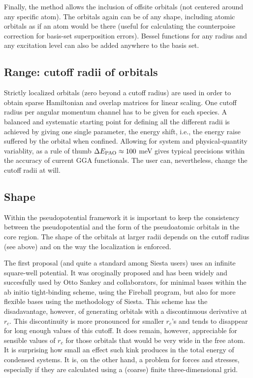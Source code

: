 \documentclass[11pt]{article}
\begin{document}
  Finally, the method allows the inclusion of offsite orbitals (not centered
around any specific atom). The orbitals again can be of any shape, including
atomic orbitals as if an atom would be there (useful for calculating the
counterpoise correction for basis-set superposition errors). 
Bessel functions for any radius and any excitation level can also be 
added anywhere to the basis set.

\subsection{Range: cutoff radii of orbitals}

  Strictly localized orbitals (zero beyond a cutoff radius) are used
in order to obtain sparse Hamiltonian and overlap matrices for linear 
scaling. One cutoff radius per angular momentum channel has to be
given for each species. 
  A balanced and systematic starting point for defining all the different 
radii is achieved by giving one single parameter, the energy shift, i.e., 
the energy raise suffered by the orbital when confined.
Allowing for system and physical-quantity variablity, as a rule of thumb
$\Delta E_{\small \rm PAO} \approx 100$ meV gives 
typical precisions within the accuracy of current GGA functionals.
The user can, nevertheless, change the cutoff radii at will.

\subsection{Shape}

  Within the pseudopotential framework it is important to keep 
the consistency between the pseudopotential and
the form of the pseudoatomic orbitals in the core region.
  The shape of the orbitals at larger radii depends on the
cutoff radius (see above) and on the way the localization 
is enforced.

  The first proposal (and quite a standard among {\sc Siesta}
users) uses an infinite square-well potential.
  It was oroginally proposed and has been widely and succesfully used 
by Otto Sankey and collaborators, for minimal bases within 
the ab initio tight-binding scheme, using the {\sc Fireball } program, 
but also for more flexible bases using the methodology of {\sc Siesta}.
  This scheme has the disadavantage, however, of generating 
orbitals with a discontinuous derivative at $r_c$. 
  This discontinuity is more pronounced for smaller $r_c$'s and
tends to disappear for long enough values of this cutoff.
  It does remain, however, appreciable for sensible values of
$r_c$ for those orbitals that would be very wide in the free atom.
  It is surprising how small an effect such kink produces in the
total energy of condensed systems.
  It is, on the other hand, a problem for forces and stresses,
especially if they are calculated using a (coarse) finite 
three-dimensional grid.
\end{document}
